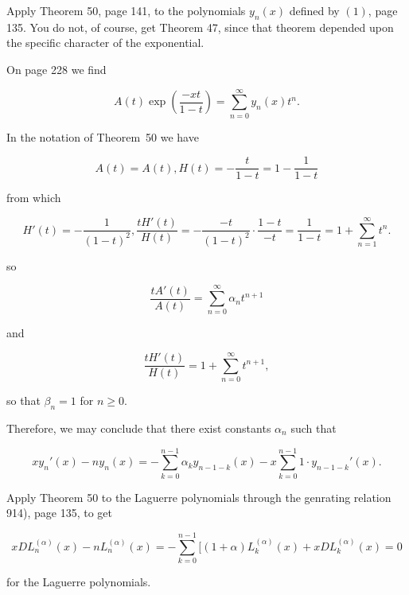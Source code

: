 \begin{problem}\label{problem5chapter8}
Apply Theorem 50, page 141, to the polynomials $y_n(x)$ defined by $(1)$, page 135. You do not, of course, get Theorem 47, since that theorem depended upon the specific character of the exponential.
\end{problem}
\begin{solution}
On page 228 we find

$$A(t) \exp \left( \dfrac{-xt}{1-t} \right) = \displaystyle\sum_{n=0}^{\infty} y_n(x) t^n.$$

In the notation of Theorem~50 we have

$$A(t) = A(t), H(t) = - \dfrac{t}{1-t} = 1 - \dfrac{1}{1-t}$$

from which

$$H'(t) = -\dfrac{1}{(1-t)^2}, \dfrac{tH'(t)}{H(t)} = -\dfrac{-t}{(1-t)^2} \cdot \dfrac{1-t}{-t} = \dfrac{1}{1-t} = 1 + \displaystyle\sum_{n=1}^{\infty} t^n.$$

so

$$\dfrac{t A'(t)}{A(t)} = \displaystyle\sum_{n=0}^{\infty} \alpha_n t^{n+1}$$

and

$$\dfrac{t H'(t)}{H(t)} = 1 + \displaystyle\sum_{n=0}^{\infty} t^{n+1},$$

so that $\beta_n=1$ for $n \geq 0$.

Therefore, we may conclude that there exist constants $\alpha_n$ such that

$$x y_n'(x) - ny_n(x) = - \displaystyle\sum_{k=0}^{n-1} \alpha_k y_{n-1-k}(x) - x \displaystyle\sum_{k=0}^{n-1} 1 \cdot y_{n-1-k}'(x).$$
\end{solution}
\begin{problem}\label{problem6chapter8}
Apply Theorem 50 to the Laguerre polynomials through the genrating relation 914), page 135, to get

$$x DL_n^{(\alpha)}(x) - nL_n^{(\alpha)}(x) = - \displaystyle\sum_{k=0}^{n-1}[(1 + \alpha) L_k^{(\alpha)}(x)+x DL_k^{(\alpha)}(x)=0$$

for the Laguerre polynomials.
\end{problem}
